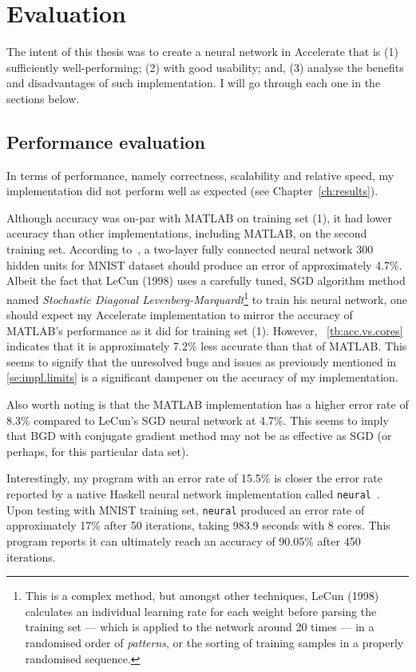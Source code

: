 \chapter{Evaluation}\label{ch:eval}

The intent of this thesis was to create a neural network in Accelerate that is (1) sufficiently well-performing; (2) with good usability; and, (3) analyse the benefits and disadvantages of such implementation. I will go through each one in the sections below.

\section{Performance evaluation} \label{se:eval.performance}

In terms of performance, namely correctness, scalability and relative speed, my implementation did not perform well as expected (see Chapter~\ref{ch:results}).

Although accuracy was on-par with MATLAB on training set (1), it had lower accuracy than other implementations, including MATLAB, on the second training set. According to~\cite{LeC98}, a two-layer fully connected neural network 300 hidden units for MNIST dataset should produce an error of approximately 4.7\%. Albeit the fact that LeCun (1998) uses a carefully tuned, SGD algorithm method named \textit{Stochastic Diagonal Levenberg-Marquardt}\footnote{This is a complex method, but amongst other techniques, LeCun (1998) calculates an individual learning rate for each weight before parsing the training set --- which is applied to the network around 20 times --- in a randomised order of \textit{patterns}, or the sorting of training samples in a properly randomised sequence.} to train his neural network, one should expect my Accelerate implementation to mirror the accuracy of MATLAB's performance as it did for training set (1). However, ~\ref{tb:acc.vs.cores} indicates that it is approximately 7.2\% less accurate than that of MATLAB. This seems to signify that the unresolved bugs and issues as previously mentioned in \ref{se:impl.limits} is a significant dampener on the accuracy of my implementation.

Also worth noting is that the MATLAB implementation has a higher error rate of 8.3\% compared to LeCun's SGD neural network at 4.7\%. This seems to imply that BGD with conjugate gradient method may not be as effective as SGD (or perhaps, for this particular data set). 

Interestingly, my program with an error rate of 15.5\% is closer the error rate reported by a native Haskell neural network implementation called \texttt{neural}~\cite{Bru16}. Upon testing with MNIST training set, \texttt{neural} produced an error rate of approximately 17\% after 50 iterations, taking 983.9 seconds with 8 cores. This program reports it can ultimately reach an accuracy of 90.05\% after 450 iterations. 

